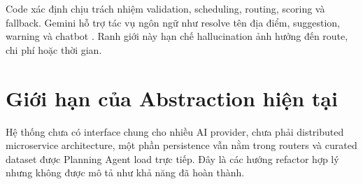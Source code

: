 Code xác định chịu trách nhiệm validation, scheduling, routing, scoring và fallback. Gemini hỗ trợ tác vụ ngôn ngữ như resolve tên địa điểm, suggestion, warning và chatbot \cite{gemini}. Ranh giới này hạn chế hallucination ảnh hưởng đến route, chi phí hoặc thời gian.

\section{Giới hạn của Abstraction hiện tại}

Hệ thống chưa có interface chung cho nhiều AI provider, chưa phải distributed microservice architecture, một phần persistence vẫn nằm trong routers và curated dataset được Planning Agent load trực tiếp. Đây là các hướng refactor hợp lý nhưng không được mô tả như khả năng đã hoàn thành.
